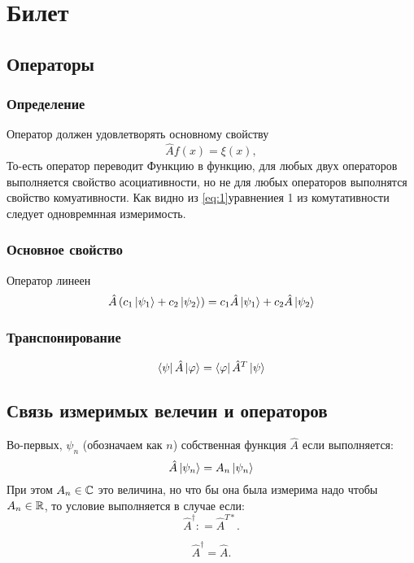 \section{Билет}
\subsection{Операторы}
\subsubsection{Определение}
Оператор должен удовлетворять основному свойству
\begin{equation} 
 \hat A f(x) = \xi (x), 
\end{equation} 
То-есть оператор переводит Функцию в функцию, для 
любых двух операторов выполняется свойство асоциативности, 
но не для любых операторов выполнятся свойство комуативности. 
Как видно из \ref{eq:1}{уравнениея 1} из комутативности следует 
одновремнная измеримость.
\subsubsection{Основное свойство}
Оператор линеен
\begin{equation} 
  \hat A \left( c_1 \ket{\psi_1} + c_2 \ket{\psi_2} \right) = 
  c_1 \hat A \ket{\psi_1} + c_2 \hat A \ket{\psi_2}
\end{equation} 
\subsubsection{Транспонирование}
\begin{equation} 
 \bra{\psi} \hat A \ket{\varphi} = \bra{\varphi} \hat A^T \ket{\psi} 
\end{equation}

\subsection{Связь измеримых велечин и операторов}
Во-первых, $\psi_n$ (обозначаем как $n$) собственная функция 
$\hat A $ если выполняется:
\begin{equation} 
 \hat A \ket{\psi_n} = A_n \ket{\psi_n}
\end{equation} 
При этом $A_n \in \mathbb{C}$ это величина, но что бы она была измерима 
надо чтобы  $A_n \in \mathbb{R}$, то условие выполняется в случае если: 
\begin{equation} 
    \hat A^\dag : = \hat A^{T *}.
\end{equation} 

\begin{equation} 
    \hat A^\dag = \hat A.
\end{equation} 










